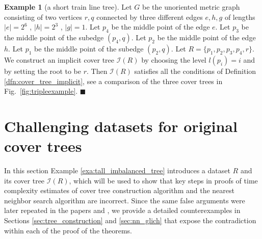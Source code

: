 \documentclass{vgtc}                          %
\numberwithin{algocf}{section}
\theoremstyle{definition}
\theoremstyle{definition}
\newtheorem{exa}[algocf]{Example}
\theoremstyle{definition}
\theoremstyle{plain}
\newcommand{\I}{\mathcal{I}}
\newcommand{\bs}{\hfill $\blacksquare$}
\begin{document}
\begin{exa}[a short train line tree]
	\label{exa:implicitexplicitexample}
	Let $G$ be the unoriented metric graph consisting of two vertices $r,q$ connected by three different edges $e,h,g$ of lengths $|e| = 2^6$ , $|h| = 2^{3}$ , $|g| = 1$. Let $p_{4}$ be the middle point of the edge $e$. 
	Let $p_{3}$ be the middle point of the subedge $(p_4 , q)$. 
	Let $p_{2}$ be the middle point of the edge $h$.
	Let $p_{1}$ be the middle point of the subedge $(p_{2}, q)$. 
	Let $R = \{p_1, p_2,p_3,p_4,r\}$. 
	We construct an implicit cover tree $\I(R)$ by choosing the level $l(p_i) = i$ and by setting the root to be $r$.
	Then $\I(R)$ satisfies all the conditions of Definition \ref{dfn:cover_tree_implicit}, see a comparison of the three cover trees in Fig.~\ref{fig:tripleexample}.
	\bs
\end{exa}

\section{Challenging datasets for original cover trees}
\label{sec:challenging_datasets}

In this section Example \ref{exa:tall_imbalanced_tree} introduces a dataset $R$ and its cover tree $\I(R)$, which will be used to show that key steps in proofs of time complexity estimates of cover tree construction algorithm \cite[Theorem~5]{beygelzimer2006cover} and the nearest neighbor search algorithm \cite[Theorem~6]{beygelzimer2006cover} are incorrect. Since the same false arguments were later repeated in the papers \cite{march2010fast} and \cite{ram2009linear}, 
we provide a detailed counterexamples in Sections \ref{sec:tree_construction} and \ref{sec:nn_glich} that expose the contradiction within each of the proof of the theorems. 



\end{document}
